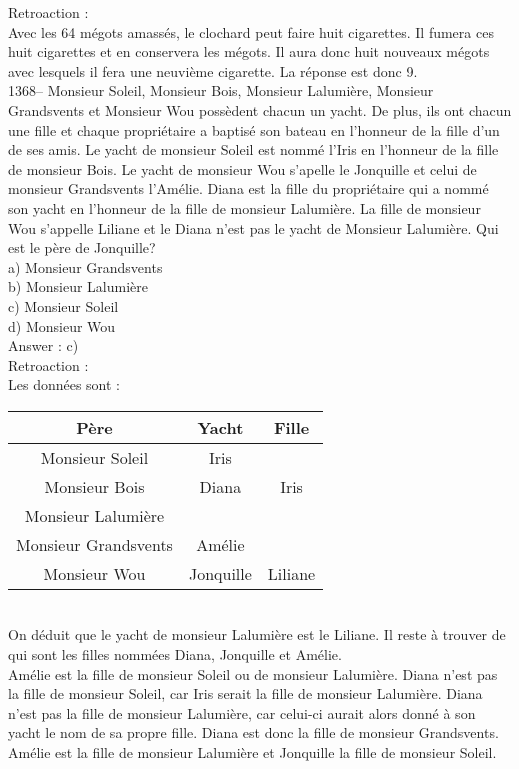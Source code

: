 ﻿\documentclass[letterpaper, 12pt]{article}
\begin{document}
Retroaction : \\
Avec les 64 m\'egots amass\'es, le clochard peut faire huit cigarettes.  Il
fumera ces huit cigarettes et en conservera les m\'egots.  Il aura donc huit
nouveaux m\'egots avec lesquels il fera une neuvi\`eme cigarette.  La
r\'eponse est donc 9.\\

1368-- Monsieur Soleil, Monsieur Bois, Monsieur Lalumi\`ere, Monsieur
Grandsvents et Monsieur Wou poss\`edent chacun un yacht.  De plus, ils ont
chacun une fille et chaque propri\'etaire a baptis\'e son bateau en
l'honneur de la fille d'un de ses amis.  Le yacht de monsieur Soleil est
nomm\'e l'Iris en l'honneur de la fille de monsieur Bois.  Le yacht de
monsieur Wou s'apelle le Jonquille et celui de monsieur Grandsvents
l'Am\'elie.  Diana est la fille du propri\'etaire qui a nomm\'e son yacht en
l'honneur de la fille de monsieur Lalumi\`ere.  La fille de monsieur Wou
s'appelle Liliane et le Diana n'est pas le yacht de Monsieur Lalumi\`ere.
Qui est le p\`ere de Jonquille?\\
a) Monsieur Grandsvents\\
b) Monsieur Lalumi\`ere\\
c) Monsieur Soleil\\
d) Monsieur Wou\\

Answer : c)\\

Retroaction : \\
Les donn\'ees sont : \\
\begin{tabular}{|c|c|c|} \hline
{\bf P\`ere} & {\bf Yacht} & {\bf Fille}  \\ \hline \hline

Monsieur Soleil        & Iris      &  \\ \hline Monsieur Bois &
Diana     &  Iris\\ \hline Monsieur Lalumi\`ere   &           &
\\ \hline Monsieur Grandsvents   & Am\'elie  &  \\ \hline Monsieur
Wou           & Jonquille &  Liliane\\ \hline

\end{tabular}\\

On d\'eduit que le yacht de monsieur Lalumi\`ere est le Liliane.  Il reste
\`a trouver de qui sont les filles nomm\'ees Diana, Jonquille et Am\'elie.
\\
Am\'elie est la fille de monsieur Soleil ou de monsieur Lalumi\`ere.  Diana
n'est pas la fille de monsieur Soleil, car Iris serait la fille de monsieur
Lalumi\`ere.  Diana n'est pas la fille de monsieur Lalumi\`ere, car celui-ci
aurait alors donn\'e \`a son yacht le nom de sa propre fille.  Diana est
donc la fille de monsieur Grandsvents.  Am\'elie est la fille de monsieur
Lalumi\`ere et Jonquille la fille de monsieur Soleil.  \\
\end{document}
